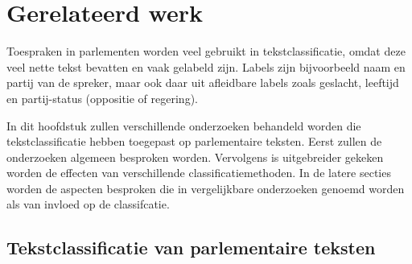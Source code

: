 \section{Gerelateerd werk}
\label{sec:rel}

Toespraken in parlementen worden veel gebruikt in tekstclassificatie, omdat deze veel nette tekst bevatten en vaak gelabeld zijn. Labels zijn bijvoorbeeld naam en partij van de spreker, maar ook daar uit afleidbare labels zoals geslacht, leeftijd en partij-status (oppositie of regering).\par
In dit hoofdstuk zullen verschillende onderzoeken behandeld worden die tekstclassificatie hebben toegepast op parlementaire teksten. Eerst zullen de onderzoeken algemeen besproken worden. Vervolgens is uitgebreider gekeken worden de effecten van verschillende classificatiemethoden. In de latere secties worden de aspecten besproken die in vergelijkbare onderzoeken genoemd worden als van invloed op de classifcatie.

\subsection{Tekstclassificatie van parlementaire teksten}

